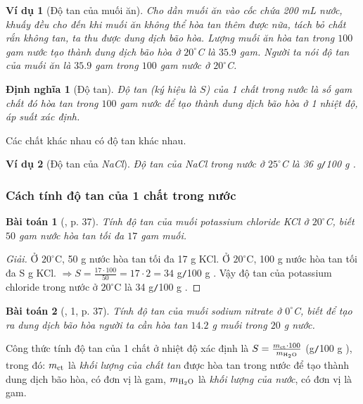 \documentclass{article}
\newtheorem{baitoan}{Bài toán}
\newtheorem{dinhnghia}{Định nghĩa}
\newtheorem{vidu}{Ví dụ}
\begin{document}
\begin{vidu}[Độ tan của muối ăn]
	Cho dần muối ăn vào cốc chứa 200 mL nước, khuấy đều cho đến khi muối ăn không thể hòa tan thêm được nữa, tách bỏ chất rắn không tan, ta thu được dung dịch bão hòa. Lượng muối ăn hòa tan trong $100$ gam nước tạo thành dung dịch bão hòa ở $20^\circ$C là $35.9$ gam. Người ta nói \emph{độ tan của muối ăn} là $35.9$ gam trong $100$ gam nước ở $20^\circ$C.
\end{vidu}

\begin{dinhnghia}[Độ tan]
	\emph{Độ tan} (ký hiệu là $S$) của 1 chất trong nước là số gam chất đó hòa tan trong $100$ gam nước để tạo thành dung dịch bão hòa ở 1 nhiệt độ, áp suất xác định.
\end{dinhnghia}
Các chất khác nhau có độ tan khác nhau.

\begin{vidu}[Độ tan của \emph{NaCl}]
	Độ tan của \emph{NaCl} trong nước ở $25^\circ$C là \emph{36 g\texttt{/}100 g }.
\end{vidu}

\subsubsection{Cách tính độ tan của 1 chất trong nước}

\begin{baitoan}[\cite{SGK_KHTN_8_Canh_Dieu}, p. 37]
	Tính độ tan của muối potassium chloride \emph{KCl} ở $20^\circ$C, biết $50$ gam nước hòa tan tối đa $17$ gam muối.
\end{baitoan}

\begin{proof}[Giải]
	Ở $20^\circ$C, 50 g nước hòa tan tối đa 17 g KCl. Ở $20^\circ$C, 100 g nước hòa tan tối đa S g KCl. $\Rightarrow S = \frac{17\cdot100}{50} = 17\cdot2 = 34$ g\texttt{/}100 g . Vậy độ tan của potassium chloride trong nước ở $20^\circ$C là 34 g\texttt{/}100 g .
\end{proof}

\begin{baitoan}[\cite{SGK_KHTN_8_Canh_Dieu}, 1, p. 37]
	Tính độ tan của muối sodium nitrate \emph{} ở $0^\circ$C, biết để tạo ra dung dịch \emph{} bão hòa người ta cần hòa tan $14.2$ g muối trong $20$ g nước.
\end{baitoan}
Công thức tính độ tan của 1 chất ở nhiệt độ xác định là $S = \frac{m_{\rm ct}\cdot100}{m_{\rm H_2O}}$ (g\texttt{/}100 g ), trong đó: $m_{\rm ct}$ là \textit{khối lượng của chất tan} được hòa tan trong nước để tạo thành dung dịch bão hòa, có đơn vị là gam, $m_{\rm H_2O}$ là \textit{khối lượng của nước}, có đơn vị là gam.
\end{document}
